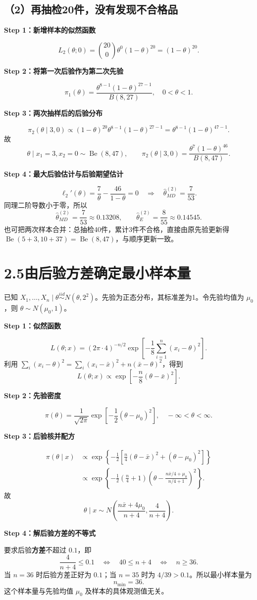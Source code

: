 \documentclass[UTF8,zihao=-4]{ctexart}
\newcommand{\step}[1]{\par\medskip\noindent\textbf{#1}\par\nopagebreak}
\newcommand{\Be}{\operatorname{Be}}
\begin{document}
\subsection*{（2）再抽检20件，没有发现不合格品}
\step{Step 1：新增样本的似然函数}
\[
L_2(\theta;0)=\binom{20}{0}\theta^0(1-\theta)^{20}=(1-\theta)^{20}.
\]
\step{Step 2：将第一次后验作为第二次先验}
\[
\pi_1(\theta)=\frac{\theta^{8-1}(1-\theta)^{27-1}}{B(8,27)},\quad0<\theta<1.
\]
\step{Step 3：两次抽样后的后验分布}
\[
\pi_2(\theta\mid3,0)\propto(1-\theta)^{20}
\theta^{8-1}(1-\theta)^{27-1}
=\theta^{8-1}(1-\theta)^{47-1}.
\]
故
\[
\boxed{\theta\mid x_1=3,x_2=0\sim\Be(8,47),}
\qquad\pi_2(\theta\mid3,0)=\frac{\theta^7(1-\theta)^{46}}{B(8,47)}.
\]
\step{Step 4：最大后验估计与后验期望估计}
\[
\ell_2'(\theta)=\frac7\theta-\frac{46}{1-\theta}=0
\quad\Longrightarrow\quad\hat\theta_{MD}^{(2)}=\frac7{53}.
\]
同理二阶导数小于零，所以
\[
\boxed{\hat\theta_{MD}^{(2)}=\frac7{53}\approx0.13208,\qquad
\hat\theta_E^{(2)}=\frac8{55}\approx0.14545.}
\]
也可把两次样本合并：总抽检40件，累计3件不合格，直接由原先验更新得
$\Be(5+3,10+37)=\Be(8,47)$，与顺序更新一致。

\section*{2.5\quad 由后验方差确定最小样本量}
已知 $X_1,\ldots,X_n\mid\theta\overset{iid}{\sim}N(\theta,2^2)$。先验为正态分布，其标准差为1。令先验均值为 $\mu_0$，则 $\theta\sim N(\mu_0,1)$。

\step{Step 1：似然函数}
\[
L(\theta;x)=(2\pi\cdot4)^{-n/2}
\exp\left[-\frac18\sum_{i=1}^n(x_i-\theta)^2\right].
\]
利用 $\sum_i(x_i-\theta)^2=\sum_i(x_i-\bar x)^2+n(\bar x-\theta)^2$，得到
\[
L(\theta;x)\propto\exp\left[-\frac n8(\theta-\bar x)^2\right].
\]

\step{Step 2：先验密度}
\[
\pi(\theta)=\frac1{\sqrt{2\pi}}
\exp\left[-\frac12(\theta-\mu_0)^2\right],\quad-\infty<\theta<\infty.
\]

\step{Step 3：后验核并配方}
\begin{align*}
\pi(\theta\mid x)
&\propto\exp\left\{-\frac12\left[\frac n4(\theta-\bar x)^2
+(\theta-\mu_0)^2\right]\right\}\\
&\propto\exp\left\{-\frac12\left(\frac n4+1\right)
\left(\theta-\frac{n\bar x/4+\mu_0}{n/4+1}\right)^2\right\}.
\end{align*}
故
\[
\theta\mid x\sim N\left(\frac{n\bar x+4\mu_0}{n+4},\frac4{n+4}\right).
\]

\step{Step 4：解后验方差的不等式}
要求后验\textbf{方差}不超过 $0.1$，即
\[
\frac4{n+4}\leq0.1
\quad\Longleftrightarrow\quad
40\leq n+4
\quad\Longleftrightarrow\quad n\geq36.
\]
当 $n=36$ 时后验方差正好为 $0.1$；当 $n=35$ 时为 $4/39>0.1$。所以最小样本量为
\[
\boxed{n_{\min}=36.}
\]
这个样本量与先验均值 $\mu_0$ 及样本的具体观测值无关。
\end{document}
